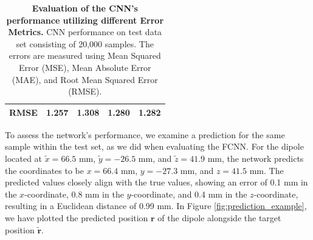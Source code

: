 \documentclass[a4paper, UKenglish, 11pt]{uiomaster}
\begin{document}
\begin{table}[!htb]
\begin{tabular}{l|cccc|}
\multicolumn{1}{|l|}{\cellcolor[HTML]{EFEFEF}RMSE} & \multicolumn{1}{c|}{1.257}                                                                                  & \multicolumn{1}{c|}{1.308}                                                                                   & \multicolumn{1}{c|}{1.280}                                                                                   & 1.282                                                                                                              \\ \hline
\end{tabular}
\caption{\textbf{Evaluation of the CNN's performance utilizing different Error Metrics.} \newline
CNN performance on test data set consisting of 20,000 samples. The errors are measured using Mean Squared Error (MSE), Mean Absolute Error (MAE), and Root Mean Squared Error (RMSE).}
\label{ch-conv-table:error_simple_dipole}
\end{table}


To assess the network's performance, we examine a prediction for the same sample within the test set, as we did when evaluating the FCNN. For the dipole located at $\tilde{x} = 66.5$ mm, $\tilde{y} = -26.5$ mm, and $\tilde{z} = 41.9$ mm, the network predicts the coordinates to be $x = 66.4$ mm, $y = -27.3$ mm, and $z = 41.5$ mm. The predicted values closely align with the true values, showing an error of 0.1 mm in the $x$-coordinate, 0.8 mm in the $y$-coordinate, and 0.4 mm in the $z$-coordinate, resulting in a Euclidean distance of 0.99 mm. In Figure \ref{fig:prediction_example}, we have plotted the predicted position $\mathbf{r}$ of the dipole alongside the target position $\mathbf{\tilde{r}}$.

\end{document}
